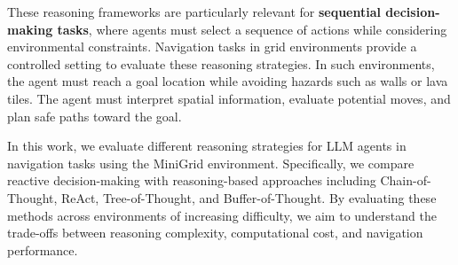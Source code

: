 These reasoning frameworks are particularly relevant for \textbf{sequential decision-making tasks}, where agents must select a sequence of actions while considering environmental constraints. Navigation tasks in grid environments provide a controlled setting to evaluate these reasoning strategies. In such environments, the agent must reach a goal location while avoiding hazards such as walls or lava tiles. The agent must interpret spatial information, evaluate potential moves, and plan safe paths toward the goal.

In this work, we evaluate different reasoning strategies for LLM agents in navigation tasks using the MiniGrid environment. Specifically, we compare reactive decision-making with reasoning-based approaches including Chain-of-Thought, ReAct, Tree-of-Thought, and Buffer-of-Thought. By evaluating these methods across environments of increasing difficulty, we aim to understand the trade-offs between reasoning complexity, computational cost, and navigation performance.